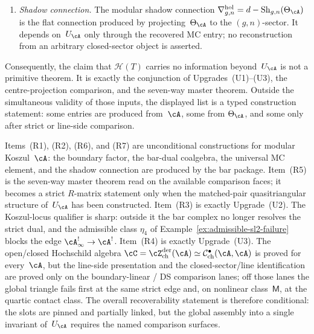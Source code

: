 \begin{proposition}
\begin{enumerate}[label=\textup{(R\arabic*)}]
 $\mathfrak{g}_\cA^{\mathrm{mod}}$ associated to~$U_\cA$ produces the
 universal Maurer--Cartan element~$\Theta_\cA$ by
 $\Theta_\cA = D_\cA - d_0$
 (Theorem~\ref{thm:mc2-bar-intrinsic}).
\item \emph{Shadow connection.} The modular shadow connection
 $\nabla^{\mathrm{hol}}_{g,n} = d - \operatorname{Sh}_{g,n}(\Theta_\cA)$
 is the flat connection produced by projecting~$\Theta_\cA$ to the
 $(g,n)$-sector. It depends on~$U_\cA$ only through the recovered
 MC entry; no reconstruction from an arbitrary closed-sector object is asserted.
\end{enumerate}
Consequently, the claim that $\mathcal{H}(T)$ carries no information
beyond~$U_\cA$ is not a primitive theorem. It is exactly the conjunction
of Upgrades~\textup{(U1)}--\textup{(U3)}, the centre-projection
comparison, and the seven-way master theorem. Outside the simultaneous
validity of those inputs, the displayed list is a typed construction
statement: some entries are produced from~$\cA$, some from
$\Theta_\cA$, and some only after strict or line-side comparison.
\end{proposition}

\begin{remark}
\label{rem:hdm-u-a-recoverability-scope}
Items~(R1), (R2), (R6), and (R7) are unconditional constructions for
modular Koszul~$\cA$: the boundary factor, the bar-dual coalgebra, the
universal MC element, and the shadow connection are produced by the
bar package. Item~(R5) is the seven-way master theorem read on the
available comparison faces; it becomes a strict $R$-matrix statement
only when the matched-pair quasitriangular structure of~$U_\cA$ has
been constructed. Item~(R3) is exactly Upgrade~(U2). The Koszul-locus
qualifier is sharp: outside it the bar complex no longer resolves the
strict dual, and the admissible class $\eta_4$ of
Example~\ref{ex:admissible-sl2-failure} blocks the edge
$\cA^{!}_\infty\to\cA^!$. Item~(R4) is exactly Upgrade~(U3). The
open/closed Hochschild algebra
$\cC=\cZ^{\mathrm{der}}_{\mathrm{ch}}(\cA)
\simeq \mathcal{C}^{\bullet}_{\mathrm{ch}}(\cA,\cA)$ is proved for
every~$\cA$, but the line-side presentation and the closed-sector/line
 identification are proved only on the boundary-linear / DS comparison
 lanes; off those lanes the global triangle fails first at the same
 strict edge and, on nonlinear class~$\mathsf{M}$, at the quartic
 contact class. The overall recoverability statement is therefore
 conditional: the slots are pinned and partially linked, but the
 global assembly into a single invariant of~$U_\cA$ requires the named
 comparison surfaces.
\end{remark}

